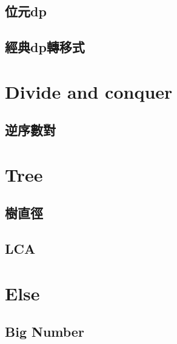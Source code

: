 \subsection{位元dp}

\subsection{經典dp轉移式}


\section{Divide and conquer}
\subsection{逆序數對}


\section{Tree}
\subsection{樹直徑}

\subsection{LCA}


\section{Else}
\subsection{Big Number}
